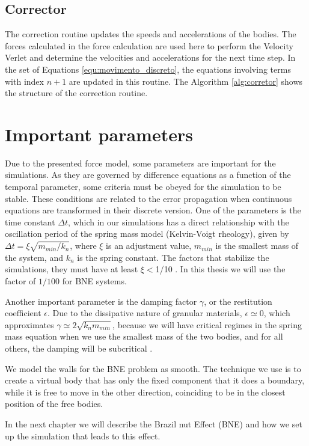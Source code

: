 

\subsection{Corrector}
    The correction routine updates the speeds and accelerations of the bodies. The forces calculated in the force calculation are used here to perform the Velocity Verlet and determine the velocities and accelerations for the next time step. In the set of Equations \ref{equ:movimento_discreto}, the equations involving terms with index $n+1$ are updated in this routine. The Algorithm \ref{alg:corretor} shows the structure of the correction routine.



\section{Important parameters}
    Due to the presented force model, some parameters are important for the simulations. As they are governed by difference equations as a function of the temporal parameter, some criteria must be obeyed for the simulation to be stable. These conditions are related to the error propagation when continuous equations are transformed in their discrete version. One of the parameters is the time constant $\Delta t$, which in our simulations has a direct relationship with the oscillation period of the spring mass model (Kelvin-Voigt rheology), given by $\Delta t = \xi \sqrt{m_{min}/k_{n}}$, where $\xi$ is an adjustment value, $m_{min}$ is the smallest mass of the system, and $k_{n}$ is the spring constant. The factors that stabilize the simulations, they must have at least $\xi < $1/10 \cite{Dissertacao, Caio-Tese, Computer_Simulation_of_Liquids}. In this thesis we will use the factor of $1/100$ for BNE systems. 

    Another important parameter is the damping factor $\gamma$, or the restitution coefficient $\epsilon$. Due to the dissipative nature of granular materials, $\epsilon \simeq 0$, which approximates $\gamma \simeq 2\sqrt{k_{n}{m}_{min}}$, because we will have critical regimes in the spring mass equation when we use the smallest mass of the two bodies, and for all others, the damping will be subcritical \cite{Bouzid-Tese, Luding-Tese}. 

    We model the walls for the BNE problem as smooth. The technique we use is to create a virtual body that has only the fixed component that it does a boundary, while it is free to move in the other direction, coinciding to be in the closest position of the free bodies.

    In the next chapter we will describe the Brazil nut Effect (BNE) and how we set up the simulation that leads to this effect.
